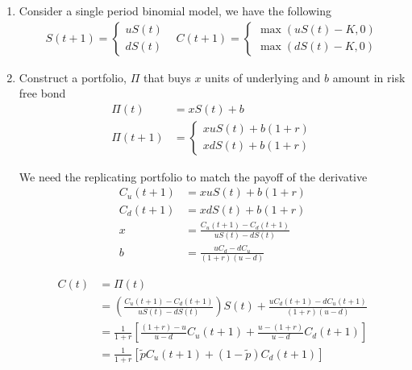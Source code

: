 \documentclass[12pt,twoside]{article}
\begin{document}
\begin{enumerate}
	\item Consider a single period binomial model, we have the following
	\begin{align*}
		S(t+1) = \begin{cases}
		uS(t)\\
		dS(t)
		\end{cases}
		&
		C(t+1) = \begin{cases}
		\max\left(uS(t)-K, 0\right)\\
		\max\left(dS(t)-K, 0\right)
		\end{cases}
	\end{align*}

	\item Construct a portfolio, $\Pi$ that buys $x$ units of underlying and $b$ amount in risk free bond
	\begin{align*}
		\Pi(t) 		& = xS(t) + b\\
		\Pi(t+1)	& = \begin{cases}
		xuS(t) + b(1+r)\\
		xdS(t) + b(1+r)
		\end{cases}
	\end{align*}

	We need the replicating portfolio to match the payoff of the derivative
	\begin{align*}
		C_u(t+1) &= xuS(t) + b(1+r) \\
		C_d(t+1) &= xdS(t) + b(1+r)\\
		x & = \frac{C_u(t+1) - C_d(t+1)}{uS(t) - dS(t)}\\
		b &= \frac{uC_d - dC_u}{(1+r)(u-d)}
	\end{align*}		

	\begin{align*}
		C(t) 	&= \Pi(t)  \\
				& = \left(\frac{C_u(t+1) - C_d(t+1)}{uS(t) - dS(t)}\right)S(t) + \frac{uC_d(t+1) - dC_u(t+1)}{(1+r)(u-d)}\\
				& = \frac{1}{1+r}\left[\frac{(1+r)-u}{u-d} C_u(t+1) + \frac{u-(1+r)}{u-d} C_d(t+1)\right]\\
				& = \frac{1}{1+r}\left[\tilde{p} C_u(t+1) + (1-\tilde{p}) C_d(t+1)\right]\\
	\end{align*}


\end{enumerate}

	
\end{document}
